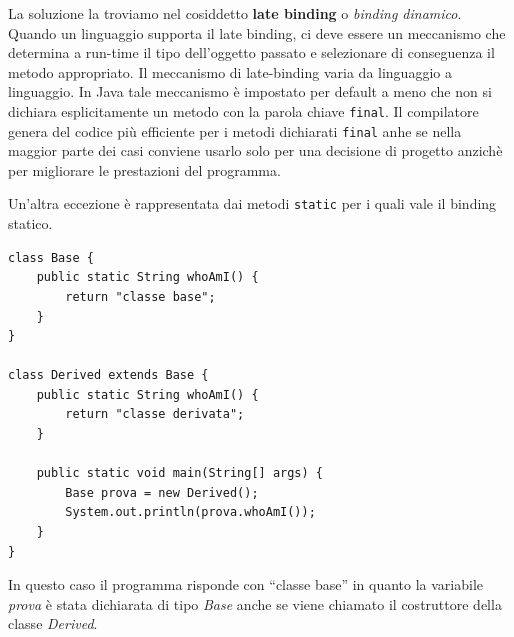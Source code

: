 \documentclass[12pt]{report}
\begin{document}
La soluzione la troviamo nel cosiddetto \textbf{late binding} o \textit{binding dinamico}. Quando un linguaggio supporta il late binding, ci deve essere un meccanismo che determina a run-time il tipo dell'oggetto passato e selezionare di conseguenza il metodo appropriato. Il meccanismo di late-binding varia da linguaggio a linguaggio. In Java tale meccanismo è impostato per default a meno che non si dichiara esplicitamente un metodo con la parola chiave \texttt{final}. Il compilatore genera del codice più efficiente per i metodi dichiarati \texttt{final} anhe se nella maggior parte dei casi conviene usarlo solo per una decisione di progetto anzichè per migliorare le prestazioni del programma.

Un'altra eccezione è rappresentata dai metodi \texttt{static} per i quali vale il binding statico.
\begin{lstlisting}[style=javastyle]
class Base {
	public static String whoAmI() {
		return "classe base";
	}
}

class Derived extends Base {
	public static String whoAmI() {
		return "classe derivata";
	}

	public static void main(String[] args) {
		Base prova = new Derived();
		System.out.println(prova.whoAmI());
	}
}
\end{lstlisting}
In questo caso il programma risponde con ``classe base'' in quanto la variabile \textit{prova} è stata dichiarata di tipo \textit{Base} anche se viene chiamato il costruttore della classe \textit{Derived}.
\end{document}
